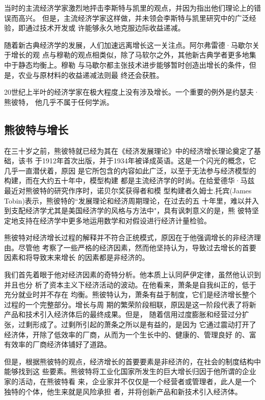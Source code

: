 当时的主流经济学家激烈地抨击李斯特与凯里的观点，并因为指出他们理论上的错误而高兴。
但是，主流经济学家这样做，并未领会李斯特与凯里研究中的广泛经验，即通过技术开发或
许能够永久地克服边际收益递减。

随着新古典经济学的发展，人们加速远离增长这一关注点。阿尔弗雷德·马歇尔关于增长的观
点与穆勒的观点相类似，除了马软尔之外，其他新古典学者更多地集中于静态均衡上。穆勒
与马歇尔都主张技术进步能够暂时创造出增长的条件，但是，农业与原材料的收益递减法则最
终还会获胜。

20世纪上半叶的经济学家在极大程度上没有涉及增长。一个重要的例外是约瑟夫·熊彼特，
他几乎不属于任何学派。

\subsection{熊彼特与增长}

在三十岁之前，熊彼特就已经为其在《经济发展理论》中的经济增长理论奠定了基础，该书
于1912年首次出版，并于1934年被译成英语。这是一个闪光的概念，它几乎一直潜伏着，原因
是它所包含的内容如此广泛，以至于无法参与经济模型的构建，而在大约五十年中，模型构建
都是主流经济学的时尚。在给爱德华·马兹最近对熊彼特的研究作序时，诺贝尔奖获得者和模
型构建者久姆士.托宾(James Tobin)表示，熊彼特的“发展理论和经济周期理论，在过去的五
十年里，难以并入到支配经济学尤其是美国经济学的风格与方法中"，具有讽刺意义的是，熊
彼特坚定地支持在经济学中更多地运用数学和对假设进行经济计量检验。

熊彼特对经济增长过程的解释并不符合正统模式，原因在于他强调增长的非经济理由。尽管他
考察了一些严格的经济因素，然而他坚持认为，导致过去增长的首要因素和将导致末来增长
的因素都是非经济的。

我们首先着眼于他对经济因素的奇特分析。他本质上认同萨伊定律，虽然他认识到并且也分
析了资本主义下经济活动的波动。在他看来，萧条是自我纠正的，低于充分就业时并不存在
均衡。熊彼特认为，萧条有益于制度，它们是经济增长整个过程的一个完整部分。增长与周
期的繁荣阶段相联，原因是这一阶段代表了将新产品和技术引入经济体后的最终成果。但是，
随着信用过度膨胀和经营过分扩张，过剩形成了。过剩所引起的萧条之所以是有益的，是因为
它通过震动打开了经济体，开除了低效率的厂商，从而为一个生长中的、健康的、管理良好
的、富有效率的厂商经济体铺好了道路。

但是，根据熊彼特的观点，经济增长的首要要素是非经济的，在社会的制度结构中能够找到这
些要素。熊彼特将工业化国家所发生的巨大增长归因于他所谓的企业家的活动，在熊彼特看
来，企业家并不仅仅是一个经营者或管理者，此人是一个独特的个体，他生来就是风险承担
者，并将创新产品和新技术引入经济体。

